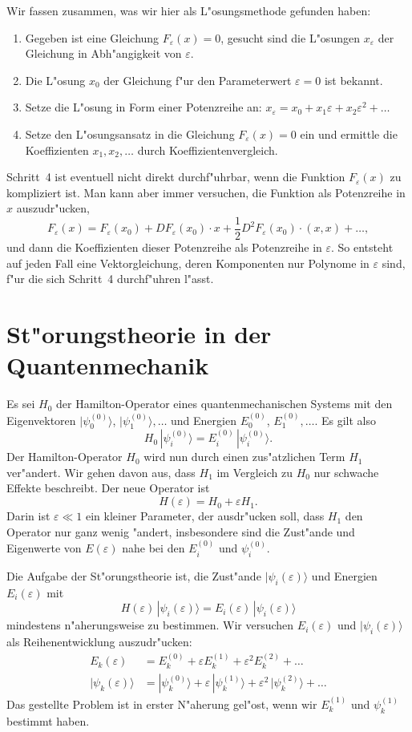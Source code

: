 Wir fassen zusammen, was wir hier als L"osungsmethode gefunden haben:
\begin{enumerate}
\item Gegeben ist eine Gleichung $F_\varepsilon(x)=0$, gesucht
sind die L"osungen $x_\varepsilon$ der Gleichung in Abh"angigkeit von
$\varepsilon$.
\item Die L"osung $x_0$ der Gleichung f"ur den Parameterwert $\varepsilon=0$
ist bekannt.
\item Setze die L"osung in Form einer Potenzreihe an:
$x_\varepsilon = x_0+x_1\varepsilon+x_2\varepsilon^2+\dots$
\item Setze den L"osungsansatz in die Gleichung $F_\varepsilon(x)=0$ ein
und ermittle die Koeffizienten $x_1,x_2,\dots$ durch Koeffizientenvergleich.
\end{enumerate}
Schritt~4 ist eventuell nicht direkt durchf"uhrbar, wenn die Funktion
$F_\varepsilon(x)$ zu kompliziert ist. Man kann aber immer versuchen, die
Funktion als Potenzreihe in $x$ auszudr"ucken, 
\[
F_\varepsilon(x)=F_\varepsilon(x_0) + DF_\varepsilon(x_0)\cdot x
+ \frac12 D^2F_\varepsilon(x_0)\cdot(x,x)+\dots,
\]
und dann die Koeffizienten dieser Potenzreihe als Potenzreihe in $\varepsilon$.
So entsteht auf jeden Fall eine Vektorgleichung, deren Komponenten nur
Polynome in $\varepsilon$ sind, f"ur die sich Schritt~4 durchf"uhren l"asst.

\section{St"orungstheorie in der Quantenmechanik}
Es sei $H_0$ der Hamilton-Operator eines quantenmechanischen Systems
mit den Eigenvektoren $|\psi_0^{(0)}\rangle$, $|\psi_1^{(0)}\rangle,\dots$
und Energien
$E_0^{(0)}$, $E_1^{(0)},\dots$.
Es gilt also 
\[
H_0\,|\psi_i^{(0)}\rangle = E_i^{(0)}\,|\psi_i^{(0)}\rangle.
\]
Der Hamilton-Operator $H_0$ wird nun durch einen zus"atzlichen Term
$H_1$ ver"andert. Wir gehen davon aus, dass $H_1$ im Vergleich zu
$H_0$ nur schwache Effekte beschreibt. Der neue Operator ist
\[
H(\varepsilon)=H_0+\varepsilon H_1.
\]
Darin ist $\varepsilon\ll 1$ ein kleiner Parameter, der ausdr"ucken
soll, dass $H_1$ den Operator nur ganz wenig "andert, insbesondere
sind die Zust"ande und Eigenwerte von $E(\varepsilon)$ nahe bei 
den $E_i^{(0)}$ und $\psi_i^{(0)}$.

Die Aufgabe der St"orungstheorie ist, die Zust"ande
$|\psi_i(\varepsilon)\rangle$
und Energien $E_i(\varepsilon)$ mit
\[
H(\varepsilon)\,|\psi_i(\varepsilon)\rangle
=
E_i(\varepsilon)\,|\psi_i(\varepsilon)\rangle
\]
mindestens n"aherungsweise zu bestimmen.
Wir versuchen $E_i(\varepsilon)$ und $|\psi_i(\varepsilon)\rangle$ als
Reihenentwicklung auszudr"ucken:
\begin{align*}
E_k(\varepsilon)
&=
E_k^{(0)}+\varepsilon E_k^{(1)} + \varepsilon^2 E_k^{(2)}+\dots
\\
|\psi_k(\varepsilon)\rangle
&=
|\psi_k^{(0)}\rangle+\varepsilon\,|\psi_k^{(1)}\rangle
+\varepsilon^2\,|\psi_k^{(2)}\rangle+\dots
\end{align*}
Das gestellte Problem ist in erster N"aherung gel"ost, wenn wir $E_k^{(1)}$
und $\psi_k^{(1)}$ bestimmt haben.

